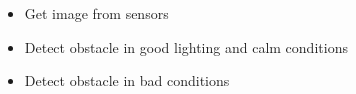 \begin{itemize}
\item Get image from sensors
\item Detect obstacle in good lighting and calm conditions
\item Detect obstacle in bad conditions
\end{itemize}